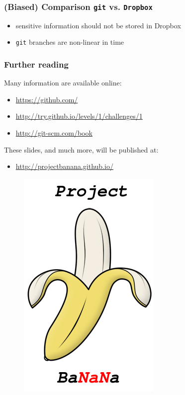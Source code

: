 \documentclass{beamer}
\begin{document}
\begin{frame}
\frametitle{(Biased) Comparison \texttt{git} vs. \texttt{Dropbox}}
\begin{itemize}
 \item sensitive information should not be stored in Dropbox
 \item \texttt{git} branches are non-linear in time
\end{itemize}
\end{frame}
\begin{frame}
\frametitle{Further reading}
Many information are available online:
\begin{itemize}
 \item \url{https://github.com/}
 \item \url{http://try.github.io/levels/1/challenges/1}
 \item \url{http://git-scm.com/book}
\end{itemize}
These slides, and much more, will be published at:
\begin{itemize}
 \item \url{http://projectbanana.github.io/}
\end{itemize}
 \begin{figure}
\centering
 \includegraphics[height=0.3\textheight]{../../images/logo}
\end{figure}

\end{frame}
\end{document}
